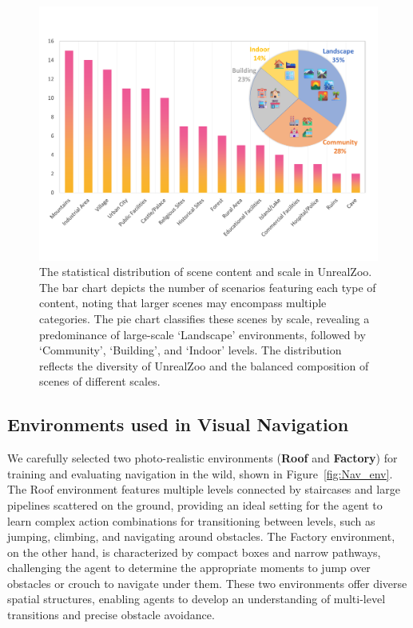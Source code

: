 \begin{figure}[t]
    \centering
    \includegraphics[width=1\linewidth]{image/stastic_full.pdf}
    \caption{The statistical distribution of scene content and scale in UnrealZoo. The bar chart depicts the number of scenarios featuring each type of content, noting that larger scenes may encompass multiple categories. The pie chart classifies these scenes by scale, revealing a predominance of large-scale `Landscape' environments, followed by `Community', `Building', and `Indoor' levels. The distribution reflects the diversity of UnrealZoo and the balanced composition of scenes of different scales. }
    \label{fig:stastic_distribution}
\end{figure}

\subsection{Environments used in Visual Navigation}
We carefully selected two photo-realistic environments (\textbf{Roof} and \textbf{Factory}) for training and evaluating navigation in the wild, shown in Figure~\ref{fig:Nav_env}. The Roof environment features multiple levels connected by staircases and large pipelines scattered on the ground, providing an ideal setting for the agent to learn complex action combinations for transitioning between levels, such as jumping, climbing, and navigating around obstacles. The Factory environment, on the other hand, is characterized by compact boxes and narrow pathways, challenging the agent to determine the appropriate moments to jump over obstacles or crouch to navigate under them. These two environments offer diverse spatial structures, enabling agents to develop an understanding of multi-level transitions and precise obstacle avoidance.

